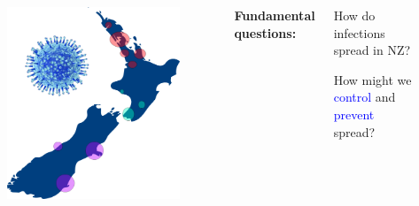 \documentclass{beamer}
\begin{document}
\begin{frame}

\begin{columns}[c] %


\begin{figure}
\includegraphics[width=0.8\linewidth]{nz1.png}
\end{figure}

\vspace{3mm}
\footnotesize{\bf{Fundamental questions:}}
\begin{itemize}
\scriptsize{
\item How do infections spread in NZ?
\item How might we \textcolor{blue}{control} and \textcolor{blue}{prevent} spread?}
\end{itemize}



\end{columns}
\end{frame}
\end{document}
